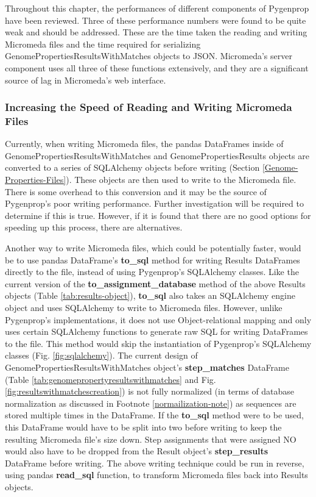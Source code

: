 Throughout this chapter, the performances of different components of Pygenprop have been reviewed. Three of these performance numbers were found to be quite weak and should be addressed. These are the time taken the reading and writing Micromeda files and the time required for serializing GenomePropertiesResultsWithMatches objects to JSON. Micromeda's server component uses all three of these functions extensively, and they are a significant source of lag in Micromeda's web interface.

\subsubsection{Increasing the Speed of Reading and Writing Micromeda Files} \label{micromeda-file-improvements}

Currently, when writing Micromeda files, the pandas DataFrames inside of GenomePropertiesResultsWithMatches and GenomePropertiesResults objects are converted to a series of SQLAlchemy objects before writing (Section \ref{Genome-Properties-Files}). These objects are then used to write to the Micromeda file. There is some overhead to this conversion and it may be the source of Pygenprop's poor writing performance. Further investigation will be required to determine if this is true. However, if it is found that there are no good options for speeding up this process, there are alternatives. 

Another way to write Micromeda files, which could be potentially faster, would be to use pandas DataFrame's \textbf{to\_sql} method for writing Results DataFrames directly to the file, instead of using Pygenprop's SQLAlchemy classes. Like the current version of the \textbf{to\_assignment\_database} method of the above Results objects (Table \ref{tab:results-object}), \textbf{to\_sql} also takes an SQLAlchemy engine object and uses SQLAlchemy to write to Micromeda files. However, unlike Pygenprop's implementations, it does not use Object-relational mapping \cite{ambler2000mapping} and only uses certain SQLAlchemy functions to generate raw SQL for writing DataFrames to the file. This method would skip the instantiation of Pygenprop's SQLAlchemy classes (Fig. \ref{fig:sqlalchemy}). The current design of GenomePropertiesResultsWithMatches object's \textbf{step\_matches} DataFrame (Table \ref{tab:genomepropertyresultswithmatches} and Fig. \ref{fig:resultswithmatchescreation}) is not fully normalized (in terms of database normalization as discussed in Footnote \ref{normailization-note}) as sequences are stored multiple times in the DataFrame. If the \textbf{to\_sql} method were to be used, this DataFrame would have to be split into two before writing to keep the resulting Micromeda file's size down. Step assignments that were assigned NO would also have to be dropped from the Result object's \textbf{step\_results} DataFrame before writing. The above writing technique could be run in reverse, using pandas \textbf{read\_sql} function, to transform Micromeda files back into Results objects.

